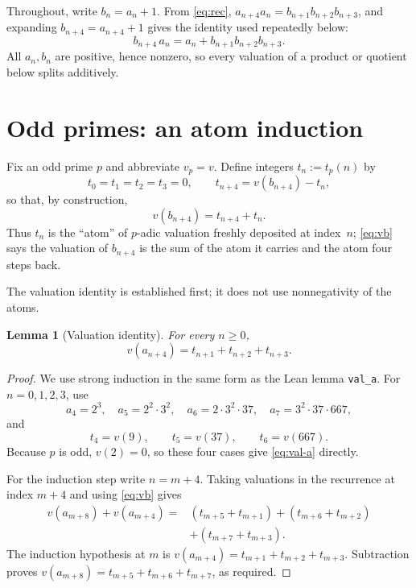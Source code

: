 \documentclass[11pt]{article}
\newtheorem{lemma}{Lemma}
\theoremstyle{remark}
\newcommand{\vp}{v_p}
\begin{document}
Throughout, write $b_n=a_n+1$.  From \eqref{eq:rec},
$a_{n+4}a_n=b_{n+1}b_{n+2}b_{n+3}$, and expanding $b_{n+4}=a_{n+4}+1$ gives
the identity used repeatedly below:
\begin{equation}
b_{n+4}\,a_n=a_n+b_{n+1}b_{n+2}b_{n+3}.
\label{eq:star}
\end{equation}
All $a_n,b_n$ are positive, hence nonzero, so every valuation of a product or
quotient below splits additively.

\section{Odd primes: an atom induction}\label{sec:odd}

Fix an odd prime $p$ and abbreviate $\vp=v$.  Define integers $t_n:=t_p(n)$ by
\begin{equation}
t_0=t_1=t_2=t_3=0,\qquad
t_{n+4}=v(b_{n+4})-t_n,
\label{eq:t-def}
\end{equation}
so that, by construction,
\begin{equation}
v(b_{n+4})=t_{n+4}+t_n .
\label{eq:vb}
\end{equation}
Thus $t_n$ is the ``atom'' of $p$-adic valuation freshly deposited at
index~$n$; \eqref{eq:vb} says the valuation of $b_{n+4}$ is the sum of the
atom it carries and the atom four steps back.

The valuation identity is established first; it does not use nonnegativity of
the atoms.

\begin{lemma}[Valuation identity]\label{lem:val-a}
For every $n\ge0$,
\begin{equation}
v(a_{n+4})=t_{n+1}+t_{n+2}+t_{n+3}.
\label{eq:val-a}
\end{equation}
\end{lemma}

\begin{proof}
We use strong induction in the same form as the Lean lemma \texttt{val\_a}.
For $n=0,1,2,3$, use
\[
a_4=2^3,\quad a_5=2^2\cdot3^2,\quad a_6=2\cdot3^2\cdot37,\quad
a_7=3^2\cdot37\cdot667,
\]
and
\[
t_4=v(9),\qquad t_5=v(37),\qquad t_6=v(667).
\]
Because $p$ is odd, $v(2)=0$, so these four cases give
\eqref{eq:val-a} directly.

For the induction step write $n=m+4$.  Taking valuations in the recurrence at
index $m+4$ and using \eqref{eq:vb} gives
\begin{align*}
v(a_{m+8})+v(a_{m+4})
={}&(t_{m+5}+t_{m+1})+(t_{m+6}+t_{m+2})\\
 &+(t_{m+7}+t_{m+3}).
\end{align*}
The induction hypothesis at $m$ is
$v(a_{m+4})=t_{m+1}+t_{m+2}+t_{m+3}$.  Subtraction proves
$v(a_{m+8})=t_{m+5}+t_{m+6}+t_{m+7}$, as required.
\end{proof}
\end{document}
